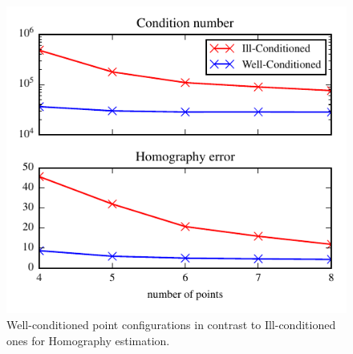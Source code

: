 \documentclass[letterpaper, 10 pt, conference]{ieeeconf}  %
\begin{document}
	\begin{figure}[t]
		\begin{center}
			\includegraphics[width=\columnwidth]{img/point_config_comp_homo.pdf}
			\caption{\label{fig:homography_results} Well-conditioned point configurations in contrast to Ill-conditioned ones for Homography estimation.}
		\end{center}
	\end{figure}
	
\end{document}

